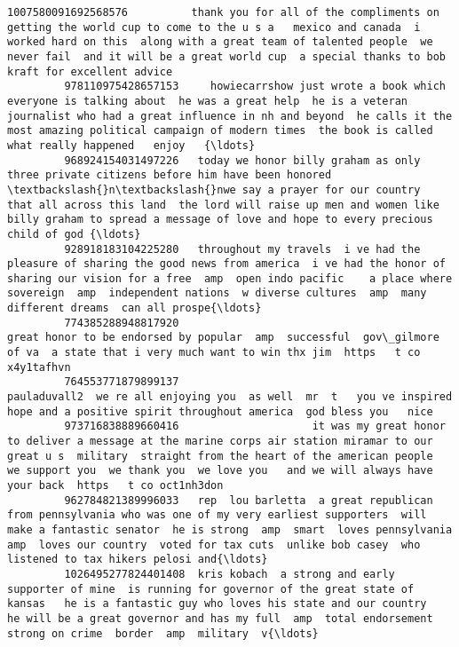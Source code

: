 \documentclass[11pt]{article}
\begin{document}
\begin{Verbatim}[commandchars=\\\{\}]
         1007580091692568576          thank you for all of the compliments on getting the world cup to come to the u s a   mexico and canada  i worked hard on this  along with a great team of talented people  we never fail  and it will be a great world cup  a special thanks to bob kraft for excellent advice    
         978110975428657153     howiecarrshow just wrote a book which everyone is talking about  he was a great help  he is a veteran journalist who had a great influence in nh and beyond  he calls it the most amazing political campaign of modern times  the book is called   what really happened   enjoy   {\ldots}   
         968924154031497226   today we honor billy graham as only three private citizens before him have been honored  \textbackslash{}n\textbackslash{}nwe say a prayer for our country  that all across this land  the lord will raise up men and women like billy graham to spread a message of love and hope to every precious child of god {\ldots}   
         928918183104225280   throughout my travels  i ve had the pleasure of sharing the good news from america  i ve had the honor of sharing our vision for a free  amp  open indo pacific    a place where sovereign  amp  independent nations  w diverse cultures  amp  many different dreams  can all prospe{\ldots}   
         774385288948817920                                                                                                                                          great honor to be endorsed by popular  amp  successful  gov\_gilmore of va  a state that i very much want to win thx jim  https   t co x4y1tafhvn   
         764553771879899137                                                                                                                                                pauladuvall2  we re all enjoying you  as well  mr  t   you ve inspired hope and a positive spirit throughout america  god bless you   nice   
         973716838889660416                     it was my great honor to deliver a message at the marine corps air station miramar to our great u s  military  straight from the heart of the american people  we support you  we thank you  we love you   and we will always have your back  https   t co oct1nh3don   
         962784821389996033   rep  lou barletta  a great republican from pennsylvania who was one of my very earliest supporters  will make a fantastic senator  he is strong  amp  smart  loves pennsylvania  amp  loves our country  voted for tax cuts  unlike bob casey  who listened to tax hikers pelosi and{\ldots}   
         1026495277824401408  kris kobach  a strong and early supporter of mine  is running for governor of the great state of kansas   he is a fantastic guy who loves his state and our country   he will be a great governor and has my full  amp  total endorsement  strong on crime  border  amp  military  v{\ldots}   

\end{Verbatim}
\end{document}
